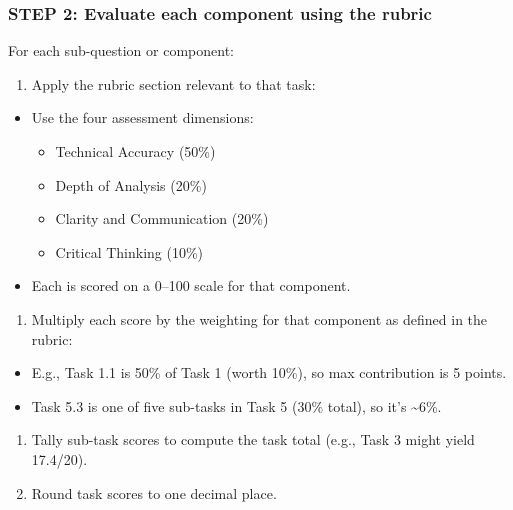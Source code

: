 \documentclass[
  10pt,
]{article}
\providecommand{\tightlist}{%
  \setlength{\itemsep}{0pt}\setlength{\parskip}{0pt}}
\begin{document}
\subsubsection{STEP 2: Evaluate each component using the
rubric}\label{step-2-evaluate-each-component-using-the-rubric}

For each sub-question or component:

\begin{enumerate}
\def\labelenumi{\arabic{enumi}.}
\tightlist
\item
  Apply the rubric section relevant to that task:
\end{enumerate}

\begin{itemize}
\tightlist
\item
  Use the four assessment dimensions:

  \begin{itemize}
  \tightlist
  \item
    Technical Accuracy (50\%)
  \item
    Depth of Analysis (20\%)
  \item
    Clarity and Communication (20\%)
  \item
    Critical Thinking (10\%)
  \end{itemize}
\item
  Each is scored on a 0--100 scale for that component.
\end{itemize}

\begin{enumerate}
\def\labelenumi{\arabic{enumi}.}
\setcounter{enumi}{1}
\tightlist
\item
  Multiply each score by the weighting for that component as defined in
  the rubric:
\end{enumerate}

\begin{itemize}
\tightlist
\item
  E.g., Task 1.1 is 50\% of Task 1 (worth 10\%), so max contribution is
  5 points.
\item
  Task 5.3 is one of five sub-tasks in Task 5 (30\% total), so it's
  \textasciitilde6\%.
\end{itemize}

\begin{enumerate}
\def\labelenumi{\arabic{enumi}.}
\setcounter{enumi}{2}
\tightlist
\item
  Tally sub-task scores to compute the task total (e.g., Task 3 might
  yield 17.4/20).
\item
  Round task scores to one decimal place.
\end{enumerate}
\end{document}
